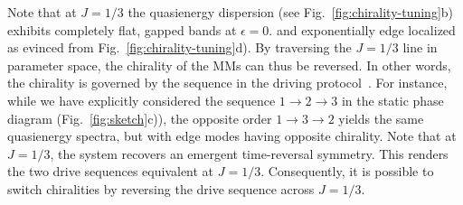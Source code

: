 \documentclass[aps,prb,twocolumn,superscriptaddress,groupedaddress]{revtex4}
\begin{document}
Note that  at $J=1/3$ the quasienergy dispersion  (see  Fig.~\ref{fig:chirality-tuning}b) exhibits completely flat, gapped bands at $\epsilon=0$.
and  exponentially edge localized  as evinced from Fig.~\ref{fig:chirality-tuning}d).
By traversing the $J=1/3$ line in parameter space,  the chirality of the MMs can thus be reversed.
In other words, the chirality is governed by the sequence in the driving protocol~\cite{Rudner:2013}.
For instance, while we have explicitly considered the sequence $1 \to 2 \to 3$ in the static phase diagram (Fig.~\ref{fig:sketch}c)), the opposite order $1 \to 3 \to 2$ yields the same quasienergy spectra, but with edge modes having opposite chirality.  
Note that at $J=1/3$, the system recovers an emergent time-reversal symmetry.
This renders the two drive sequences equivalent at $J=1/3$.
Consequently, it is possible to switch chiralities by reversing the drive sequence across $J=1/3$.
\end{document}
